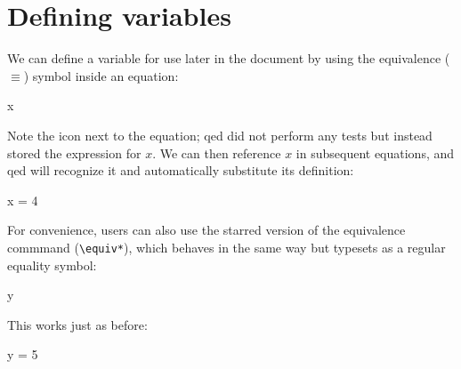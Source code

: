 \documentclass{article}
\begin{document}
\section*{Defining variables}

We can define a variable for use later in the document by using the
equivalence ($\equiv$) symbol inside an equation:
%
\begin{qed}
    x \equiv {}
\end{qed}
%
Note the icon next to the equation; \textsf{qed} did not perform
any tests but instead stored the expression for $x$.
%
We can then reference $x$ in subsequent equations, and \textsf{qed}
will recognize it and automatically substitute its definition:
%
\begin{qed}
    x = 4
\end{qed}
%
For convenience, users can also use the starred version of the
equivalence commmand (\verb!\equiv*!), which behaves in the same
way but typesets as a regular equality symbol:
%
%
\begin{qed}
    y \equiv* {}
\end{qed}
%
This works just as before:
%
\begin{qed}
    y = 5
\end{qed}
%
%
\end{document}
